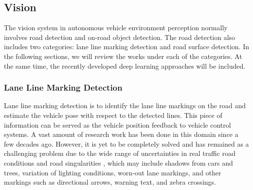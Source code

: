 


\subsection{Vision}

The vision system in autonomous vehicle environment perception normally involves
road detection and on-road object detection. The road detection also includes
two categories: lane line marking detection and road surface detection. In the
following sections, we will review the works under each of the categories. At
the same time, the recently developed deep learning approaches will be included.

\subsubsection{Lane Line Marking Detection}

Lane line marking detection is to identify the lane line markings on the road
and estimate the vehicle pose with respect to the detected lines. This piece of
information can be served as the vehicle position feedback to vehicle control
systems. A vast amount of research work has been done in this domain since a few
decades ago. However, it is yet to be completely solved and has remained as a
challenging problem due to the wide range of uncertainties in real traffic road
conditions and road singularities \cite{road}, which may include shadows from
cars and trees, variation of lighting conditions, worn-out lane markings, and
other markings such as directional arrows, warning text, and zebra crossings.

